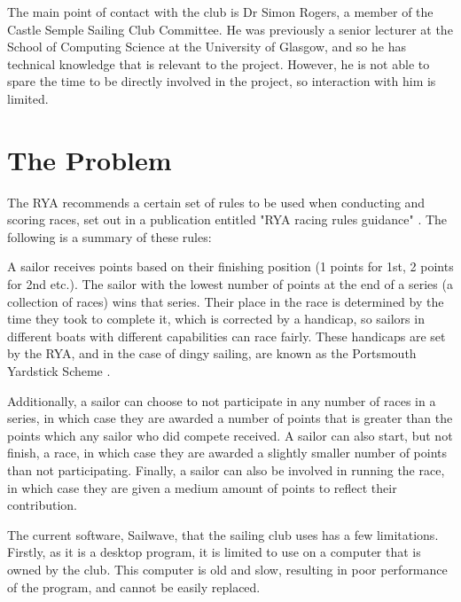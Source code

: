 \documentclass{l4proj}
\begin{document}
The main point of contact with the club is Dr Simon Rogers, a member of the Castle Semple Sailing Club Committee. He was previously a senior lecturer at the School of Computing Science at the University of Glasgow, and so he has technical knowledge that is relevant to the project. However, he is not able to spare the time to be directly involved in the project, so interaction with him is limited. 

\section{The Problem}
The RYA recommends a certain set of rules to be used when conducting and scoring races, set out in a publication entitled "RYA racing rules guidance" \citep{RYAscore}. The following is a summary of these rules:

A sailor receives points based on their finishing position (1 points for 1st, 2 points for 2nd etc.). The sailor with the lowest number of points at the end of a series (a collection of races) wins that series. Their place in the race is determined by the time they took to complete it, which is corrected by a handicap, so sailors in different boats with different capabilities can race fairly. These handicaps are set by the RYA, and in the case of dingy sailing, are known as the Portsmouth Yardstick Scheme \citep{RYApy}.

Additionally, a sailor can choose to not participate in any number of races in a series, in which case they are awarded a number of points that is greater than the points which any sailor who did compete received. A sailor can also start, but not finish, a race, in which case they are awarded a slightly smaller number of points than not participating. Finally, a sailor can also be involved in running the race, in which case they are given a medium amount of points to reflect their contribution.

The current software, Sailwave, that the sailing club uses has a few limitations. Firstly, as it is a desktop program, it is limited to use on a computer that is owned by the club. This computer is old and slow, resulting in poor performance of the program, and cannot be easily replaced.
\end{document}
